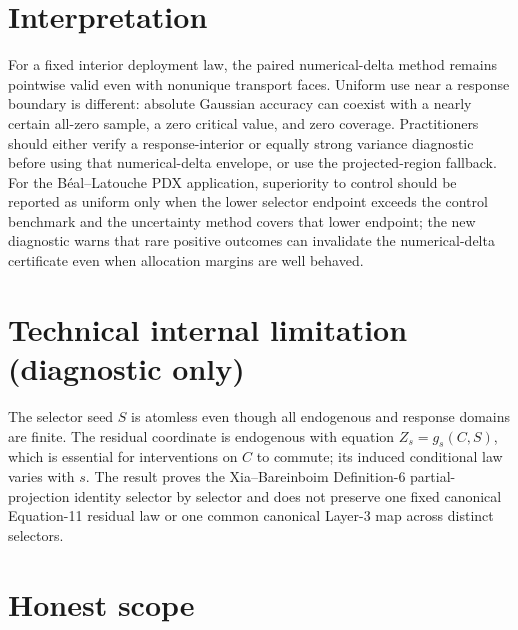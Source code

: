 \documentclass{article}
\begin{document}
\section{Interpretation}

For a fixed interior deployment law, the paired numerical-delta method remains pointwise valid even with nonunique transport faces. Uniform use near a response boundary is different: absolute Gaussian accuracy can coexist with a nearly certain all-zero sample, a zero critical value, and zero coverage. Practitioners should either verify a response-interior or equally strong variance diagnostic before using that numerical-delta envelope, or use the projected-region fallback. For the Béal--Latouche PDX application, superiority to control should be reported as uniform only when the lower selector endpoint exceeds the control benchmark and the uncertainty method covers that lower endpoint; the new diagnostic warns that rare positive outcomes can invalidate the numerical-delta certificate even when allocation margins are well behaved.

\section*{Technical internal limitation (diagnostic only)}

The selector seed \(S\) is atomless even though all endogenous and response domains are finite. The residual coordinate is endogenous with equation \(Z_s=g_s(C,S)\), which is essential for interventions on \(C\) to commute; its induced conditional law varies with \(s\). The result proves the Xia--Bareinboim Definition-6 partial-projection identity selector by selector and does not preserve one fixed canonical Equation-11 residual law or one common canonical Layer-3 map across distinct selectors.

\section{Honest scope}
\end{document}
